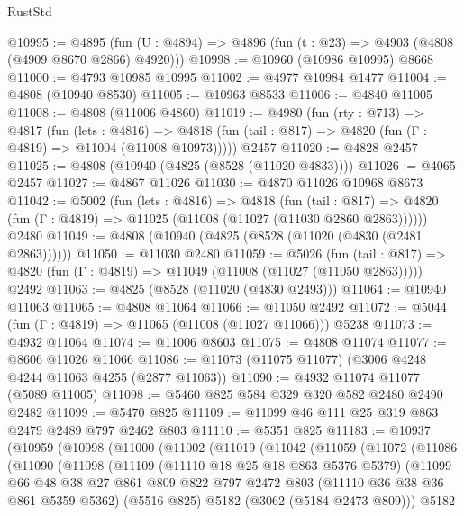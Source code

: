 \begin{lexlean}{RustStd}
\begin{coremodule}
@10995 := @4895
    (fun (U : @4894) => @4896 (fun (t : @23) => @4903 (@4808 (@4909 @8670 @2866) @4920)))
@10998 := @10960 (@10986 @10995) @8668
@11000 := @4793 @10985 @10995
@11002 := @4977 @10984 @1477
@11004 := @4808 (@10940 @8530)
@11005 := @10963 @8533
@11006 := @4840 @11005
@11008 := @4808 (@11006 @4860)
@11019 := @4980
    (fun (rty : @713) =>
    @4817
      (fun (lets : @4816) =>
      @4818 (fun (tail : @817) => @4820 (fun (Γ : @4819) => @11004 (@11008 @10973)))))
    @2457
@11020 := @4828 @2457
@11025 := @4808 (@10940 (@4825 (@8528 (@11020 @4833))))
@11026 := @4065 @2457
@11027 := @4867 @11026
@11030 := @4870 @11026 @10968 @8673
@11042 := @5002
    (fun (lets : @4816) =>
    @4818
      (fun (tail : @817) =>
      @4820 (fun (Γ : @4819) => @11025 (@11008 (@11027 (@11030 @2860 @2863))))))
    @2480
@11049 := @4808 (@10940 (@4825 (@8528 (@11020 (@4830 (@2481 @2863))))))
@11050 := @11030 @2480
@11059 := @5026
    (fun (tail : @817) => @4820 (fun (Γ : @4819) => @11049 (@11008 (@11027 (@11050 @2863)))))
    @2492
@11063 := @4825 (@8528 (@11020 (@4830 @2493)))
@11064 := @10940 @11063
@11065 := @4808 @11064
@11066 := @11050 @2492
@11072 := @5044 (fun (Γ : @4819) => @11065 (@11008 (@11027 @11066))) @5238
@11073 := @4932 @11064
@11074 := @11006 @8603
@11075 := @4808 @11074
@11077 := @8606 @11026 @11066
@11086 := @11073 (@11075 @11077) (@3006 @4248 @4244 @11063 @4255 (@2877 @11063))
@11090 := @4932 @11074 @11077 (@5089 @11005)
@11098 := @5460 @825 @584 @329 @320 @582 @2480 @2490 @2482
@11099 := @5470 @825
@11109 := @11099 @46 @111 @25 @319 @863 @2479 @2489 @797 @2462 @803
@11110 := @5351 @825
@11183 := @10937
    (@10959
      (@10998
        (@11000
          (@11002
            (@11019
              (@11042
                (@11059
                  (@11072
                    (@11086
                      (@11090
                        (@11098
                          (@11109
                            (@11110 @18 @25 @18 @863 @5376 @5379)
                            (@11099
                              @66
                              @48
                              @38
                              @27
                              @861
                              @809
                              @822
                              @797
                              @2472
                              @803
                              (@11110 @36 @38 @36 @861 @5359 @5362)
                              (@5516 @825)
                              @5182
                              (@3062 (@5184 @2473 @809)))
                            @5182

\end{coremodule}
\end{lexlean}

